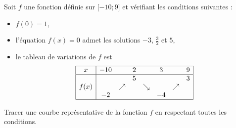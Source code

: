 
\begin{exercice}\label{exosmath-0319}

    Soit \( f\) une fonction définie sur \( \mathopen[ -10 ;9 \mathclose]\) et vérifiant les conditions suivantes :
    \begin{itemize}
        \item 
            \( f(0)=1\),
        \item
            l'équation \( f(x)=0\) admet les solutions \( -3\), \( \frac{ 3 }{2}\) et \( 5\),
        \item
            le tableau de variations de \( f\) est
            \begin{equation*}
                \begin{array}[]{|c|ccccccc|}
                    \hline
                    x&-10&&2&&3&&9\\
                    \hline
                    &&&5&&&&3\\
                    f(x)&&\nearrow&&\searrow&&\nearrow&\\
                    &-2&&&&-4&&\\
                    \hline
                \end{array}
            \end{equation*}
            
    \end{itemize}
    Tracer une courbe représentative de la fonction \( f\) en respectant toutes les conditions.

\end{exercice}
